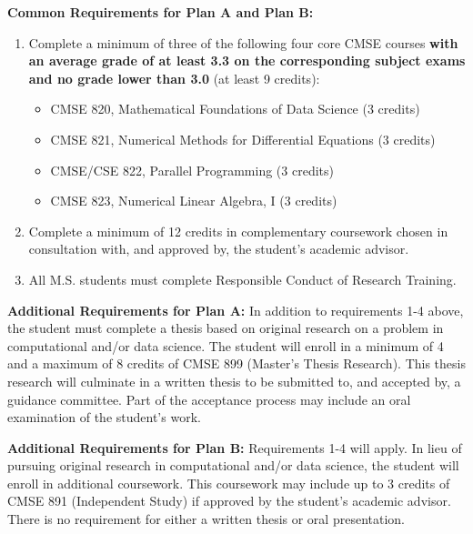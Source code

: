 \vspace{3mm}
\noindent
\textbf{Common Requirements for Plan A and Plan B:}

\begin{enumerate}

\item Complete a minimum of three of the following four core CMSE
  courses \textbf{with an average grade of at least 3.3 on the
    corresponding subject exams and no grade lower than 3.0} (at least
  9 credits):

\begin{itemize}
    \item  CMSE 820, Mathematical Foundations of Data Science (3 credits)  
    \item  CMSE 821, Numerical Methods for Differential Equations (3 credits)  
    \item  CMSE/CSE 822, Parallel Programming (3 credits)  
    \item  CMSE 823, Numerical Linear Algebra, I (3 credits)  
\end{itemize}

\item Complete a minimum of 12 credits in complementary coursework
  chosen in consultation with, and approved by, the student’s academic
  advisor. 
 
\item All M.S. students must complete Responsible Conduct of Research
  Training.
\end{enumerate}

\vspace{3mm}
\noindent
\textbf{Additional Requirements for Plan A:} In addition to
requirements 1-4 above, the student must complete a thesis based on
original research on a problem in computational and/or data
science. The student will enroll in a minimum of 4 and a maximum of 8
credits of CMSE 899 (Master’s Thesis Research). This thesis research
will culminate in a written thesis to be submitted to, and accepted
by, a guidance committee. Part of the acceptance process may include
an oral examination of the student’s work.

\vspace{3mm}
\noindent
\textbf{Additional Requirements for Plan B:} Requirements 1-4 will
apply. In lieu of pursuing original research in computational and/or
data science, the student will enroll in additional coursework. This
coursework may include up to 3 credits of CMSE 891 (Independent Study)
if approved by the student’s academic advisor. There is no requirement
for either a written thesis or oral presentation.

